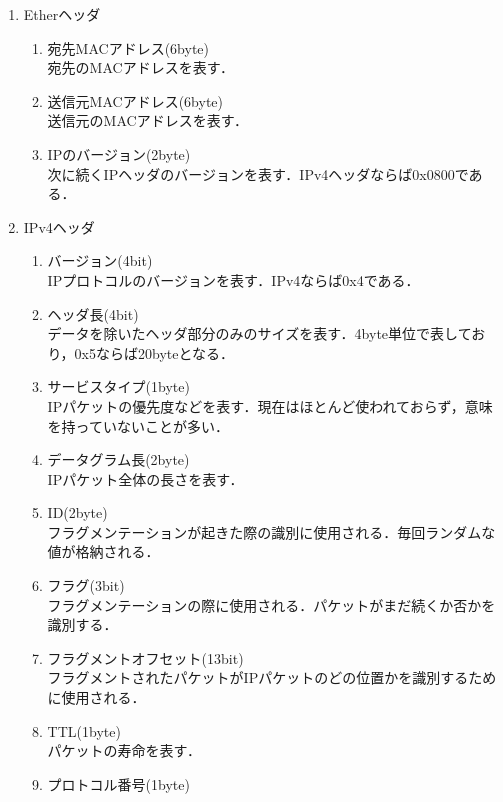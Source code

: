 \documentclass[12pt]{jsarticle}
\begin{document}
\begin{enumerate}
    \item Etherヘッダ
        \begin{enumerate}
            \item 宛先MACアドレス(6byte)\\
                宛先のMACアドレスを表す．
            \item 送信元MACアドレス(6byte)\\
                送信元のMACアドレスを表す．
            \item IPのバージョン(2byte)\\
                次に続くIPヘッダのバージョンを表す．IPv4ヘッダならば0x0800である．
        \end{enumerate}
    \item IPv4ヘッダ
        \begin{enumerate}
            \item バージョン(4bit)\\
                IPプロトコルのバージョンを表す．IPv4ならば0x4である．
            \item ヘッダ長(4bit)\\
                データを除いたヘッダ部分のみのサイズを表す．4byte単位で表しており，0x5ならば20byteとなる．
            \item サービスタイプ(1byte)\\
                IPパケットの優先度などを表す．現在はほとんど使われておらず，意味を持っていないことが多い．
            \item データグラム長(2byte)\\
                IPパケット全体の長さを表す．
            \item ID(2byte)\\
                フラグメンテーションが起きた際の識別に使用される．毎回ランダムな値が格納される．
            \item フラグ(3bit)\\
                フラグメンテーションの際に使用される．パケットがまだ続くか否かを識別する．
            \item フラグメントオフセット(13bit)\\
                フラグメントされたパケットがIPパケットのどの位置かを識別するために使用される．
            \item TTL(1byte)\\
                パケットの寿命を表す．
            \item プロトコル番号(1byte)\\

\end{enumerate}
\end{enumerate}
\end{document}
